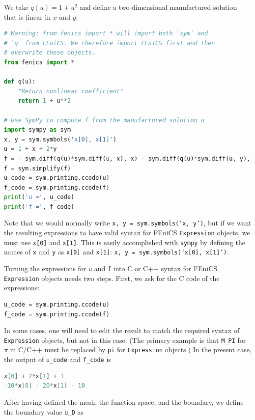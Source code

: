 \documentclass[graybox,envcountchap,sectrefs,final]{svmonodo}
\newenvironment{notice_mdfboxadmon}[1][]{
\begin{notice_mdfboxmdframed}[frametitle=#1]
}
{
\end{notice_mdfboxmdframed}
}
\begin{document}
We take $q(u) = 1 + u^2$ and define a two-dimensional manufactured
solution that is linear in $x$ and $y$:

\begin{lstlisting}[language=Python,style=graycolor]
# Warning: from fenics import * will import both `sym` and
# `q` from FEniCS. We therefore import FEniCS first and then
# overwrite these objects.
from fenics import *

def q(u):
    "Return nonlinear coefficient"
    return 1 + u**2

# Use SymPy to compute f from the manufactured solution u
import sympy as sym
x, y = sym.symbols('x[0], x[1]')
u = 1 + x + 2*y
f = - sym.diff(q(u)*sym.diff(u, x), x) - sym.diff(q(u)*sym.diff(u, y), y)
f = sym.simplify(f)
u_code = sym.printing.ccode(u)
f_code = sym.printing.ccode(f)
print('u =', u_code)
print('f =', f_code)
\end{lstlisting}


\begin{notice_mdfboxadmon}
Note that we would normally write \texttt{x, y = sym.symbols('x, y')}, but
if we want the resulting expressions to have valid syntax for
FEniCS \texttt{Expression} objects, we must use \texttt{x[0]} and \texttt{x[1]}.
This is easily accomplished with \texttt{sympy} by defining the names of \texttt{x} and
\texttt{y} as \texttt{x[0]} and \texttt{x[1]}: \texttt{x, y = sym.symbols('x[0], x[1]')}.
\end{notice_mdfboxadmon} %

Turning the expressions for \texttt{u} and \texttt{f} into C or C++ syntax for
FEniCS \texttt{Expression} objects needs two steps. First, we ask for the C
code of the expressions:

\begin{lstlisting}[language=Python,style=graycolor]
u_code = sym.printing.ccode(u)
f_code = sym.printing.ccode(f)
\end{lstlisting}
In some cases, one will need to edit the result to match the required
syntax of \texttt{Expression} objects, but not in this case. (The primary
example is that \Verb!M_PI! for $\pi$ in C/C++ must be replaced by \texttt{pi} for
\texttt{Expression} objects.) In the present case, the output of \Verb!u_code! and
\Verb!f_code! is

\begin{lstlisting}[language=C,style=graycolor]
x[0] + 2*x[1] + 1
-10*x[0] - 20*x[1] - 10
\end{lstlisting}
After having defined the mesh, the function space, and the boundary,
we define the boundary value \Verb!u_D! as
\end{document}
